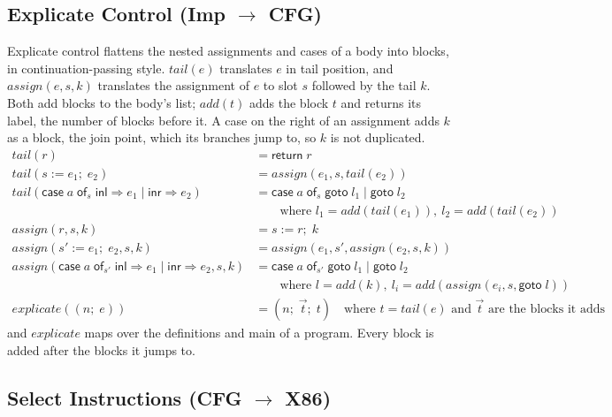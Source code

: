 \documentclass[10pt]{article}
\theoremstyle{acmplain}
\newcommand{\key}[1]{\mathsf{#1}}
\newcommand{\pass}[1]{\mathit{#1}}
\newcommand{\assign}[3]{#1 \mathrel{:=} #2;\; #3}
\newcommand{\Casei}[4]{\key{case}\;#1\;\key{of}_{#2}\;\key{inl} \Rightarrow #3 \mid \key{inr} \Rightarrow #4}
\begin{document}
\subsection{Explicate Control (Imp \texorpdfstring{$\to$}{->} CFG)}

Explicate control flattens the nested assignments and cases of a body
into blocks, in continuation-passing style. $\pass{tail}(e)$ translates
$e$ in tail position, and $\pass{assign}(e, s, k)$ translates the
assignment of $e$ to slot $s$ followed by the tail $k$. Both add blocks
to the body's list; $\pass{add}(t)$ adds the block $t$ and returns its
label, the number of blocks before it. A case on the right of an
assignment adds $k$ as a block, the join point, which its branches jump
to, so $k$ is not duplicated.
\begin{align*}
  \pass{tail}(r) &= \key{return}\; r \\
  \pass{tail}(\assign{s}{e_1}{e_2}) &= \pass{assign}(e_1, s, \pass{tail}(e_2)) \\
  \pass{tail}(\Casei{a}{s}{e_1}{e_2}) &=
    \key{case}\;a\;\key{of}_{s}\;\key{goto}\;l_1 \mid \key{goto}\;l_2 \\
  &\qquad \text{where } l_1 = \pass{add}(\pass{tail}(e_1)),\ l_2 = \pass{add}(\pass{tail}(e_2)) \\[1ex]
  \pass{assign}(r, s, k) &= \assign{s}{r}{k} \\
  \pass{assign}(\assign{s'}{e_1}{e_2}, s, k) &= \pass{assign}(e_1, s', \pass{assign}(e_2, s, k)) \\
  \pass{assign}(\Casei{a}{s'}{e_1}{e_2}, s, k) &=
    \key{case}\;a\;\key{of}_{s'}\;\key{goto}\;l_1 \mid \key{goto}\;l_2 \\
  &\qquad \text{where } l = \pass{add}(k),\
    l_i = \pass{add}(\pass{assign}(e_i, s, \key{goto}\;l)) \\[1ex]
  \pass{explicate}((n;\; e)) &= (n;\; \vec{t};\; t)
    \quad\text{where } t = \pass{tail}(e) \text{ and } \vec{t} \text{ are the blocks it adds}
\end{align*}
and $\pass{explicate}$ maps over the definitions and main of a program.
Every block is added after the blocks it jumps to.

\subsection{Select Instructions (CFG \texorpdfstring{$\to$}{->} X86)}
\end{document}
